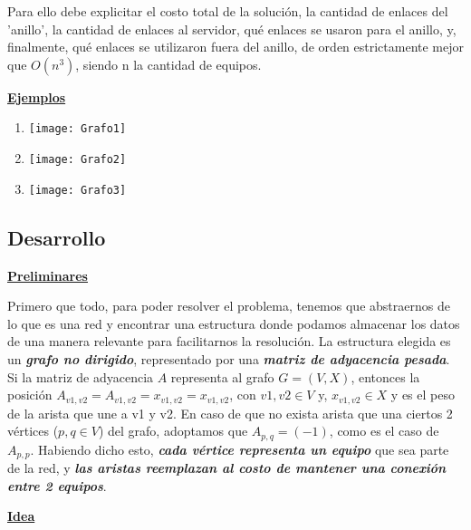 \documentclass[10pt,a4paper]{article}
\begin{document}
Para ello debe explicitar el costo total de la solución, la cantidad de enlaces del 'anillo', la cantidad de enlaces al servidor, qué enlaces se usaron para el anillo,  y, finalmente, qué enlaces se utilizaron fuera del anillo, de orden estrictamente mejor que $O(n^3)$, siendo n la cantidad de equipos.

\noindent \textbf{\underline{Ejemplos}}
\begin{enumerate}
\item \texttt{[image: Grafo1]}
\newline
\newline
\item \texttt{[image: Grafo2]}
\newline
\newline
\item \texttt{[image: Grafo3]}
\end{enumerate}

\newpage
\subsection{Desarrollo}

\noindent \textbf{\underline{Preliminares}}

Primero que todo, para poder resolver el problema, tenemos que abstraernos de lo que es una red y encontrar una estructura donde podamos almacenar los datos de una manera relevante para facilitarnos la resolución. La estructura elegida es un \textbf{\textit{grafo no dirigido}}, representado por una \textbf{\textit{matriz de adyacencia pesada}}. Si la matriz de adyacencia $A$ representa al grafo $G = (V,X)$, entonces la posición $A_{v1,v2} = A_{v1,v2} = x_{v1,v2} = x_{v1,v2}$, con $v1,v2 \in V$ y, $x_{v1,v2} \in X$ y es el peso de la arista que une a v1 y v2. En caso de que no exista arista que una ciertos 2 vértices ($p,q \in V$) del grafo, adoptamos que $A_{p,q} = (-1)$, como es el caso de $A_{p,p}$. Habiendo dicho esto, \textbf{\textit{cada vértice representa un equipo}} que sea parte de la red, y \textbf{\textit{las aristas reemplazan al costo de mantener una conexión entre 2 equipos}}.

\noindent \textbf{\underline{Idea}}
\end{document}
